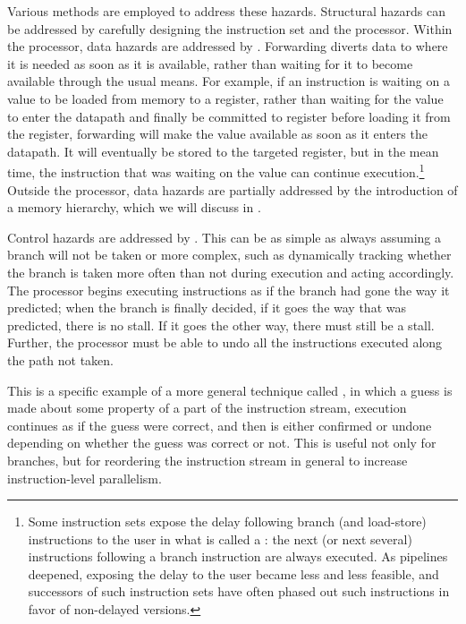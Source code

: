 Various methods are employed to address these hazards. Structural hazards can be addressed by carefully designing the instruction set and the processor. Within the processor, data hazards are addressed by . Forwarding diverts data to where it is needed as soon as it is available, rather than waiting for it to become available through the usual means. For example, if an instruction is waiting on a value to be loaded from memory to a register, rather than waiting for the value to enter the datapath and finally be committed to register before loading it from the register, forwarding will make the value available as soon as it enters the datapath. It will eventually be stored to the targeted register, but in the mean time, the instruction that was waiting on the value can continue execution.\footnote{Some instruction sets expose the delay following branch (and load-store) instructions to the user in what is called a : the next (or next several) instructions following a branch instruction are always executed. As pipelines deepened, exposing the delay to the user became less and less feasible, and successors of such instruction sets have often phased out such instructions in favor of non-delayed versions.} Outside the processor, data hazards are partially addressed by the introduction of a memory hierarchy, which we will discuss in .

Control hazards are addressed by . This can be as simple as always assuming a branch will not be taken or more complex, such as dynamically tracking whether the branch is taken more often than not during execution and acting accordingly. The processor begins executing instructions as if the branch had gone the way it predicted; when the branch is finally decided, if it goes the way that was predicted, there is no stall. If it goes the other way, there must still be a stall. Further, the processor must be able to undo all the instructions executed along the path not taken.

This is a specific example of a more general technique called , in which a guess is made about some property of a part of the instruction stream, execution continues as if the guess were correct, and then is either confirmed or undone depending on whether the guess was correct or not. This is useful not only for branches, but for reordering the instruction stream in general to increase instruction-level parallelism.

